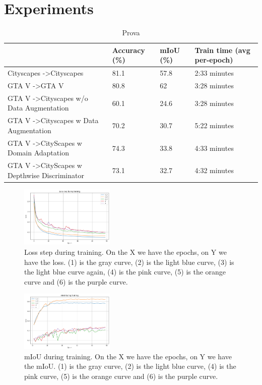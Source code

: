 \documentclass[conference]{IEEEtran}
\begin{document}
\section{Experiments}

\begin{table}[]
\centering
\caption{Prova}
\label{TrainingTimaAndAccuracy}
\begin{tabular}{@{}llll@{}}
\toprule
                                                         & Accuracy (\%) & mIoU (\%) & Train time (avg per-epoch) \\ \midrule
Cityscapes -\textgreater Cityscapes                      & 81.1          & 57.8      & 2:33 minutes               \\
GTA V -\textgreater GTA V                                & 80.8          & 62        & 3:28 minutes               \\
GTA V -\textgreater Cityscapes w/o Data Augmentation     & 60.1          & 24.6      & 3:28 minutes               \\
GTA V -\textgreater Cityscapes w Data Augmentation       & 70.2          & 30.7      & 5:22 minutes               \\
GTA V -\textgreater CityScapes w Domain Adaptation       & 74.3          & 33.8      & 4:33 minutes               \\
GTA V -\textgreater CityScapes w Depthwise Discriminator & 73.1          & 32.7      & 4:32 minutes               \\ \bottomrule
\end{tabular}
\end{table}

\begin{figure}[tp]
\centerline{\includegraphics[width=0.4\textwidth]{figures/loss}}
\caption{Loss step during training. On the X we have the epochs, on Y we have the loss. (1) is the gray curve, (2) is the light blue
curve, (3) is the light blue curve again, (4) is the pink curve, (5) is the orange curve and (6) is the purple curve.}
\label{loss_steps}
\end{figure}

\begin{figure}[tp]
\centerline{\includegraphics[width=0.4\textwidth]{figures/miou}}
\caption{mIoU during training. On the X we have the epochs, on Y we have the mIoU. (1) is the gray curve, (2) is the light blue
curve, (4) is the pink curve, (5) is the orange curve and (6) is the purple curve.}
\label{miou}
\end{figure}
\end{document}
